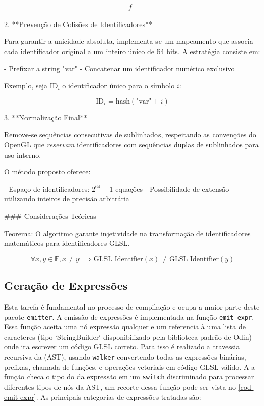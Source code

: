    \[ f__1\_ \]

2. **Prevenção de Colisões de Identificadores**
   
   Para garantir a unicidade absoluta, implementa-se um mapeamento que associa cada identificador original a um inteiro único de 64 bits. A estratégia consiste em:
   
   - Prefixar a string "var"
   - Concatenar um identificador numérico exclusivo
   
   Exemplo, seja $\text{ID}_i$ o identificador único para o símbolo $i$:

   \[ \text{ID}_i = \text{hash}(\text{"var"} + i) \]

3. **Normalização Final**
   
   Remove-se sequências consecutivas de sublinhados, respeitando as convenções do OpenGL que \emph{reservam} identificadores com sequências duplas de sublinhados para uso interno.

O método proposto oferece:

- Espaço de identificadores: $2^{64} - 1$ equações
- Possibilidade de extensão utilizando inteiros de precisão arbitrária

### Considerações Teóricas

Teorema: O algoritmo garante injetividade na transformação de identificadores matemáticos para identificadores GLSL.

\[ \forall x, y \in \mathbb{E}, x \neq y \implies \text{GLSL\_Identifier}(x) \neq \text{GLSL\_Identifier}(y) \]

\subsection{Geração de Expressões}


Esta tarefa é fundamental no processo de compilação e ocupa a maior parte deste pacote \texttt{emitter}.
A emissão de expressões é implementada na função \verb`emit_expr`. Essa função aceita uma nó expressão qualquer e um referencia à uma lista de caracteres (tipo `StringBuilder` disponibilizado pela biblioteca padrão de Odin) onde ira escrever um código GLSL correto. Para isso é realizado a travessia recursiva da (AST), usando \texttt{walker} convertendo todas as expressões binárias, prefixas, chamada de funções,  e operações vetoriais em código GLSL válido. A a função checa o tipo do da expressão em um \verb`switch` discriminado para processar diferentes tipos de nós da AST, um recorte dessa função pode ser vista no \autoref{cod-emit-expr}. As principais categorias de expressões tratadas são:

